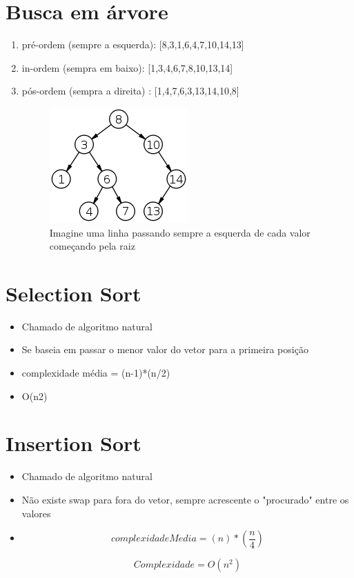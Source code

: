 \documentclass{article}
\begin{document}
\section{Busca em árvore}


	\begin{enumerate}

	\item pré-ordem (sempre a esquerda): [8,3,1,6,4,7,10,14,13]
	\item in-ordem (sempra em baixo): [1,3,4,6,7,8,10,13,14]
	\item pós-ordem (sempra a direita) : [1,4,7,6,3,13,14,10,8]

	\begin{figure}
		\centering	
		\includegraphics[scale=1]{arvorebinaria.jpg}
		\caption{Imagine uma linha passando sempre a esquerda de cada valor começando pela raiz} 	
	\end{figure}


	\end{enumerate}

\section{Selection Sort}
	\begin{itemize}
	\item Chamado de algoritmo natural
	\item Se baseia em passar o menor valor do vetor para a primeira posição
	\item complexidade média = (n-1)*(n/2)
	\item O(n2)	
	\end{itemize}
\section{Insertion Sort}
	\begin{itemize}
	\item Chamado de algoritmo natural
	\item Não existe swap para fora do vetor, sempre acrescente o "procurado" entre os valores
	\item 
		\begin{equation}
			complexidadeMedia = (n)*(\frac{n}{4})
		\end{equation}
		
		\begin{equation}
			Complexidade= O(n^{2})
		\end{equation}
	\end{itemize}
\end{document}
